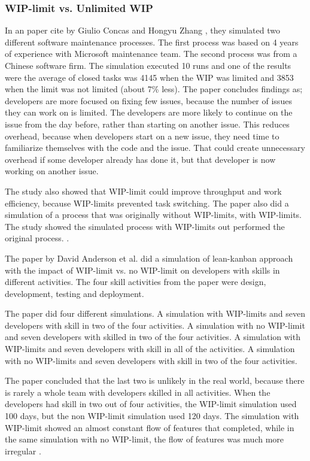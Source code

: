 \documentclass[UKenglish]{ifimaster}  %
\begin{document}
\subsubsection {WIP-limit vs. Unlimited WIP}
\label{sub:wip:vs:wip}
In an paper cite by Giulio Concas and Hongyu Zhang \parencite{SMR:SMR1599}, they simulated two different software maintenance processes. The first process was based on 4 years of experience with Microsoft maintenance team. The second process was from a Chinese software firm.  The simulation executed 10 runs and one of the results were the average of closed tasks was 4145 when the WIP was limited and 3853 when the limit was not limited (about 7\% less). The paper concludes findings as; developers are more focused on fixing few issues, because the number of issues they can work on is limited. The developers are more likely to continue on the issue from the day before, rather than starting on another issue. This reduces overhead, because when developers start on a new issue, they need time to familiarize themselves with the code and the issue. That could create unnecessary overhead if some developer already has done it, but that developer is now working on another issue. 

The study also showed that WIP-limit could improve throughput and work efficiency, because WIP-limits prevented task switching. The paper also did a simulation of a process that was originally without WIP-limits, with WIP-limits. The study showed the simulated process with WIP-limits out performed the original process. \parencite{SMR:SMR1599}.

The paper by David Anderson et al. \parencite{DavidAnderson} did a simulation of lean-kanban approach with the impact of WIP-limit vs. no WIP-limit on developers with skills in different activities. The four skill activities from the paper were design, development, testing and deployment. 

The paper did four different simulations.  A simulation with WIP-limits and seven developers with skill in two of the four activities. A simulation with no WIP-limit and seven developers with skilled in two of the four activities. A simulation with WIP-limits and seven developers with skill in all of the activities. A simulation with no WIP-limits and seven developers with skill in two of the four activities.

The paper concluded that the last two is unlikely in the real world, because there is rarely a whole team with developers skilled in all activities. 
When the developers had skill in two out of four activities, the WIP-limit simulation used 100 days, but the non WIP-limit simulation used 120 days. The simulation with WIP-limit showed an almost constant flow of features that completed, while in the same simulation with no WIP-limit, the flow of features was much more irregular \parencite{DavidAnderson}.
\end{document}
